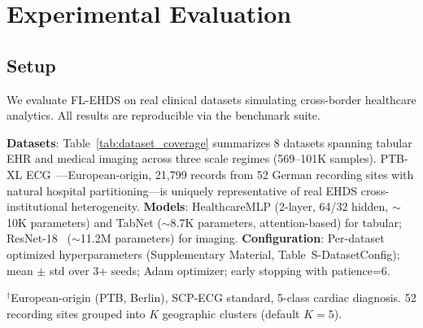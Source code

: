 \documentclass[conference]{IEEEtran}
\begin{document}
\section{Experimental Evaluation}
\label{sec:experiments}

\subsection{Setup}

We evaluate FL-EHDS on real clinical datasets simulating cross-border healthcare analytics. All results are reproducible via the benchmark suite.

\textbf{Datasets}: Table~\ref{tab:dataset_coverage} summarizes 8 datasets spanning tabular EHR and medical imaging across three scale regimes (569--101K samples). PTB-XL ECG~\cite{wagner2020ptbxl}---European-origin, 21,799 records from 52 German recording sites with natural hospital partitioning---is uniquely representative of real EHDS cross-institutional heterogeneity. \textbf{Models}: HealthcareMLP (2-layer, 64/32 hidden, $\sim$10K parameters) and TabNet ($\sim$8.7K parameters, attention-based) for tabular; ResNet-18~\cite{he2016deep} ($\sim$11.2M parameters) for imaging. \textbf{Configuration}: Per-dataset optimized hyperparameters (Supplementary Material, Table~S-DatasetConfig); mean $\pm$ std over 3+ seeds; Adam optimizer; early stopping with patience=6.

\begin{table}[htbp]
\centering
\caption{Evaluated Dataset Coverage}
\label{tab:dataset_coverage}

\vspace{1mm}
\footnotesize{$^\dagger$European-origin (PTB, Berlin), SCP-ECG standard, 5-class cardiac diagnosis. 52 recording sites grouped into $K$ geographic clusters (default $K{=}5$).}
\end{table}
\end{document}

